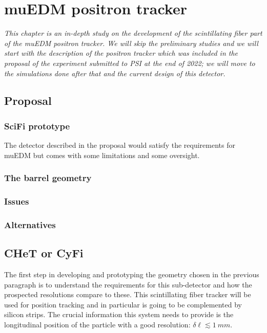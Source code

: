 \chapter{muEDM positron tracker}
\begin{refsection}
{\itshape This chapter is an in-depth study on the development of the scintillating fiber part of the muEDM positron tracker. 
We will skip the preliminary studies and we will start with the description of the positron tracker which was included in the proposal of the experiment submitted to PSI at the end of 2022; we will move to the simulations done after that and the current design of this detector.}
\section{Proposal}
\subsection{SciFi prototype}
The detector described in the proposal would satisfy the requirements for muEDM but comes with some limitations and some oversight.
\subsection{The barrel geometry}
\subsection{Issues}
\subsection{Alternatives}

\section{CHeT or CyFi}
The first step in developing and prototyping the geometry chosen in the previous paragraph is to understand the requirements for this sub-detector and how the prospected resolutions compare to these.
This scintillating fiber tracker will be used for position tracking and in particular is going to be complemented by silicon strips. The crucial information this system needs to provide is the longitudinal position of the particle with a good resolution: $\delta \ell \lesssim \SI{1}{mm}$.


\end{refsection}
